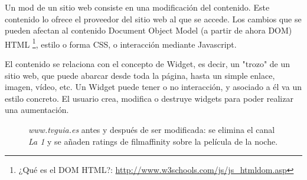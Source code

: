 Un mod de un sitio web consiste en una modificación del contenido. Este contenido lo ofrece el proveedor del sitio web al que se accede. Los cambios que se pueden afectan al contenido Document Object Model (a partir de ahora DOM) HTML \footnote{¿Qué es el DOM HTML?: \url{http://www.w3schools.com/js/js_htmldom.asp}}, estilo o forma CSS, o interacción mediante Javascript. 

El contenido se relaciona con el concepto de Widget, es decir, un "trozo" de un sitio web, que puede abarcar desde toda la página, hasta un simple enlace, imagen, vídeo, etc. Un Widget puede tener o no interacción, y asociado a él va un estilo concreto. El usuario crea, modifica o destruye widgets para poder realizar una aumentación.

\begin{figure}
\begin{center}
\caption{\emph{www.tvguia.es} antes y después de ser modificada: se elimina el canal \emph{La 1} y se añaden ratings de filmaffinity sobre la película de la noche.}
\label{fig:1-TVGuia}
\end{center}
\end{figure}


